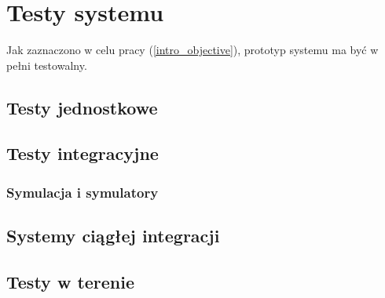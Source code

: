 \chapter{Testy systemu} \label{chapter_tests}

Jak zaznaczono w celu pracy (\ref{intro_objective}), prototyp systemu
ma być w pełni testowalny. 

\section{Testy jednostkowe}
\section{Testy integracyjne}
\subsection{Symulacja i symulatory}
\section{Systemy ciągłej integracji}
\section{Testy w terenie}

